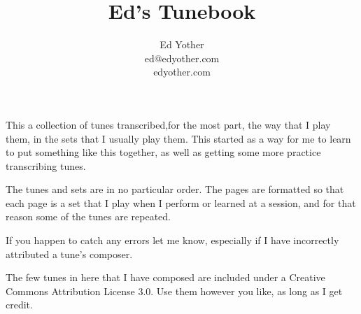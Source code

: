 \documentclass[12pt,letterpaper]{article}
\begin{document}

\title{Ed's Tunebook}
\author{Ed Yother\\ed@edyother.com\\edyother.com}
\maketitle

This a collection of tunes transcribed,for the most part, the way that I play them, in the sets that I usually play them. This started as a way for me to learn to put something like this together, as well as getting some more practice transcribing tunes. 

The tunes and sets are in no particular order. The pages are formatted so that each page is a set that I play when I perform or learned at a session, and for that reason some of the tunes are repeated.

If you happen to catch any errors let me know, especially if I have incorrectly attributed a tune's composer.

The few tunes in here that I have composed are included under a Creative Commons Attribution License 3.0. Use them however you like, as long as I get credit.

\pagebreak
\tableofcontents

\newpage
{}

\setcounter{page}{1}


\newpage
{}


\newpage
{}


\newpage
{}


\newpage
{}


\newpage
{}


\newpage
{}

\end{document}
